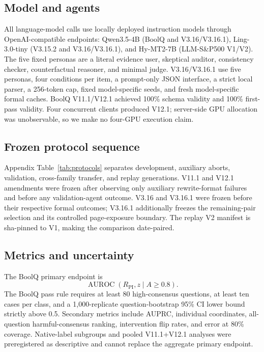 \documentclass[11pt]{article}
\newcommand{\rpi}{R_{\mathrm{PI}}}
\begin{document}
\subsection{Model and agents}

All language-model calls use locally deployed instruction models through OpenAI-compatible endpoints: Qwen3.5-4B (BoolQ and V3.16/V3.16.1), Ling-3.0-tiny (V3.15.2 and V3.16/V3.16.1), and Hy-MT2-7B (LLM-S\&P500 V1/V2). The five fixed personas are a literal evidence user, skeptical auditor, consistency checker, counterfactual reasoner, and minimal judge. V3.16/V3.16.1 use five personas, four conditions per item, a prompt-only JSON interface, a strict local parser, a 256-token cap, fixed model-specific seeds, and fresh model-specific formal caches. BoolQ V11.1/V12.1 achieved 100\% schema validity and 100\% first-pass validity. Four concurrent clients produced V12.1; server-side GPU allocation was unobservable, so we make no four-GPU execution claim.

\subsection{Frozen protocol sequence}

Appendix Table~\ref{tab:protocols} separates development, auxiliary aborts, validation, cross-family transfer, and replay generations. V11.1 and V12.1 amendments were frozen after observing only auxiliary rewrite-format failures and before any validation-agent outcome. V3.16 and V3.16.1 were frozen before their respective formal outcomes; V3.16.1 additionally freezes the remaining-pair selection and its controlled page-exposure boundary. The replay V2 manifest is sha-pinned to V1, making the comparison date-paired.

\subsection{Metrics and uncertainty}

The BoolQ primary endpoint is
\begin{equation}
\operatorname{AUROC}(\rpi,z\mid A\geq0.8).
\end{equation}
The BoolQ pass rule requires at least 80 high-consensus questions, at least ten cases per class, and a 1,000-replicate question-bootstrap 95\% CI lower bound strictly above 0.5. Secondary metrics include AUPRC, individual coordinates, all-question harmful-consensus ranking, intervention flip rates, and error at 80\% coverage. Native-label subgroups and pooled V11.1+V12.1 analyses were preregistered as descriptive and cannot replace the aggregate primary endpoint.
\end{document}
